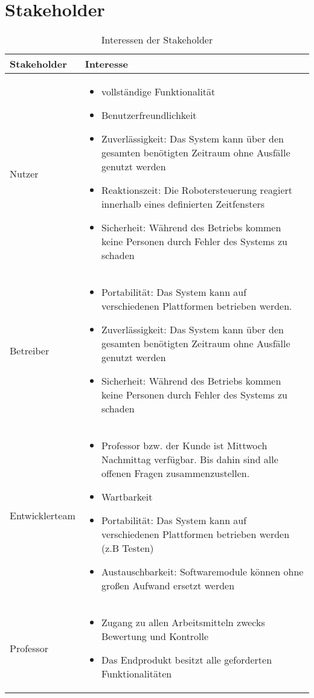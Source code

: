 \clearpage
\section{Stakeholder}
\begin{table}[h!]
	\caption{Interessen der Stakeholder}
	\label{tab:stakeholder}
	\centering
	\begin{tabular}{|p{2.5cm}|p{10cm}|}
		\hline
		\textbf{Stakeholder} & \textbf{Interesse}  \\
		\hline
		Nutzer   
		& \parbox{10cm}{\begin{itemize}
			\item vollständige Funktionalität
			\item Benutzerfreundlichkeit
			\item Zuverlässigkeit: Das System kann über den gesamten benötigten Zeitraum ohne Ausfälle genutzt werden
			\item Reaktionszeit: Die Robotersteuerung reagiert innerhalb eines definierten Zeitfensters
			\item Sicherheit: Während des Betriebs kommen keine Personen durch Fehler des Systems zu schaden
		\end{itemize}}
		\\
		\hline
		Betreiber 
		&\parbox{10cm}{
			\begin{itemize}
			\item Portabilität: Das System kann auf verschiedenen Plattformen betrieben werden.
			\item Zuverlässigkeit: Das System kann über den gesamten benötigten Zeitraum ohne Ausfälle genutzt werden
			\item Sicherheit: Während des Betriebs kommen keine Personen durch Fehler des Systems zu schaden
			\end{itemize}}
		\\
		\hline
		Entwicklerteam 
		&\parbox{10cm}{ \begin{itemize}
			\item Professor bzw. der \glqq Kunde\grqq{} ist Mittwoch Nachmittag verfügbar. Bis dahin sind alle offenen Fragen zusammenzustellen.
			\item Wartbarkeit
			\item Portabilität: Das System kann auf verschiedenen Plattformen betrieben werden (z.B Testen)
			\item Austauschbarkeit: Softwaremodule können ohne großen Aufwand ersetzt werden
		\end{itemize}}
		\\
		\hline
		Professor & \parbox{10cm}{\begin{itemize}
			\item Zugang zu allen Arbeitsmitteln zwecks Bewertung und Kontrolle
			\item Das Endprodukt besitzt alle geforderten Funktionalitäten
		\end{itemize}}
		\\
		\hline
	\end{tabular}
\end{table}



